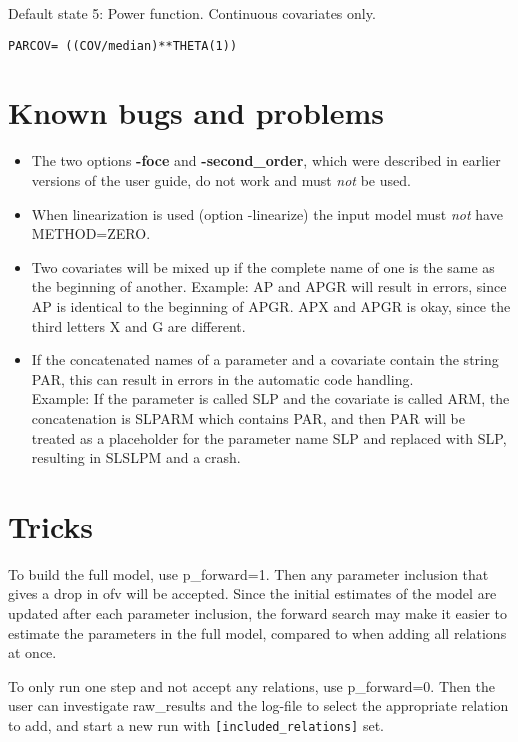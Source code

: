 Default state 5: Power function. Continuous covariates only.
\begin{verbatim}
PARCOV= ((COV/median)**THETA(1))
\end{verbatim}

\section{Known bugs and problems}
\begin{itemize}
	\item The two options \textbf{-foce} and \textbf{-second\_order}, which were described in earlier versions of the user guide, do not work and must \emph{not} be used.
	\item When linearization is used (option -linearize) the input model must \emph{not} have METHOD=ZERO.
	\item Two covariates will be mixed up if the complete name of one is the same as the beginning of another. Example: AP and APGR will result in errors, since AP is identical to the beginning of APGR. APX and APGR is okay, since the third letters X and G are different. 
	\item If the concatenated names of a parameter and a covariate contain the string PAR, this can result in errors in the automatic code handling.\\
	Example: If the parameter is called SLP and the covariate is called ARM, the concatenation is SLPARM which contains PAR, and then PAR will be treated as a placeholder for the parameter name SLP and replaced with SLP, resulting in SLSLPM and a crash.
\end{itemize}

\section{Tricks}
To build the full model, use p\_forward=1. Then any parameter inclusion that gives a drop in ofv will be accepted. Since the initial estimates of the model are updated after each parameter inclusion, the forward search may make it easier to estimate the parameters in the full model, compared to when adding all relations at once.

To only run one step and not accept any relations, use p\_forward=0. Then the user can investigate raw\_results and the log-file to select the appropriate relation to add, and start a new run with \verb|[included_relations]| set.



